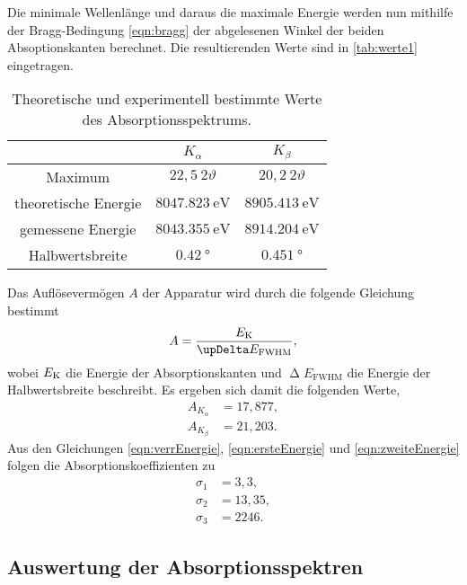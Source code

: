Die minimale Wellenlänge und daraus die maximale Energie werden nun mithilfe der Bragg-Bedingung \eqref{eqn:bragg} der abgelesenen Winkel der beiden Absoptionskanten
berechnet. Die resultierenden Werte sind in \autoref{tab:werte1} eingetragen.
\begin{table}[H]
  \caption{Theoretische und experimentell bestimmte Werte des Absorptionsspektrums.}
  \label{tab:werte1}
  \centering
  \begin{tabular}{c c c}
      \toprule
       & $K_\alpha$ & $K_\beta$\\
      \midrule
      Maximum & $22,5 ~ 2\vartheta$ & $20,2 ~ 2\vartheta$ \\
      theoretische Energie & $\SI{8047,823}{\eV}$ & $\SI{8905,413}{\eV}$ \\
      gemessene Energie & $\SI{8043,355}{\eV}$ & $\SI{8914,204}{\eV}$ \\
      Halbwertsbreite & $\SI{0,42}{\degree}$ & $\SI{0,451}{\degree}$ \\
      \bottomrule
    \end{tabular}
\end{table}

Das Auflösevermögen $A$ der Apparatur wird durch die folgende Gleichung bestimmt
\begin{align*}
  A = \frac{E_{\text K}}{\upDelta E_{\text{FWHM}}},
\end{align*}
wobei $E_{\text K}$ die Energie der Absorptionskanten und $\upDelta E_{\text{FWHM}}$ die Energie der Halbwertsbreite beschreibt.
Es ergeben sich damit die folgenden Werte,
\begin{align*}
  A_{K_\alpha} &= 17,877, \\
  A_{K_\beta} &= 21,203.
\end{align*}
Aus den Gleichungen \eqref{eqn:verrEnergie}, \eqref{eqn:ersteEnergie} und \eqref{eqn:zweiteEnergie} folgen die Absorptionskoeffizienten zu
\begin{align*}
  \sigma_1 &= 3,3, \\
  \sigma_2 &= 13,35, \\
  \sigma_3 &= 2246. 
\end{align*}

\subsection{Auswertung der Absorptionsspektren}
\label{subsec:absorbis}

